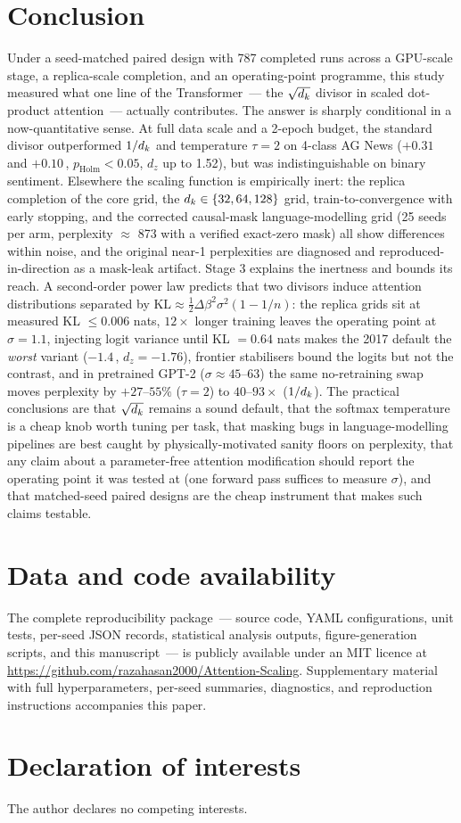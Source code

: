 \section{Conclusion}\label{sec:conclusion}
Under a seed-matched paired design with 787 completed runs across a GPU-scale
stage, a replica-scale completion, and an operating-point programme, this
study measured what one line of the Transformer~--- the $\sqrt{d_k}$ divisor
in scaled dot-product attention~--- actually contributes. The answer is
sharply conditional in a now-quantitative sense. At full data scale and a
2-epoch budget, the standard divisor outperformed $1/d_k$ and temperature
$\tau = 2$ on 4-class AG News ($+0.31$ and $+0.10$\,\pp, $p_{\text{Holm}} <
0.05$, $d_z$ up to 1.52), but was indistinguishable on binary sentiment.
Elsewhere the scaling function is empirically inert: the replica completion of
the core grid, the $d_k \in \{32,64,128\}$ grid, train-to-convergence with
early stopping, and the corrected causal-mask language-modelling grid (25
seeds per arm, perple\-xity $\approx$ 873 with a verified exact-zero mask) all
show differences within noise, and the original near-1 perplexities are
diagnosed and reproduced-in-direction as a mask-leak artifact. Stage 3
explains the inertness and bounds its reach. A second-order power law
predicts that two divisors induce attention distributions separated by
$\mathrm{KL} \approx \tfrac{1}{2}\Delta\beta^2\sigma^2(1-1/n)$: the replica
grids sit at measured KL $\le 0.006$ nats, $12\times$ longer training leaves
the operating point at $\sigma = 1.1$, injecting logit variance until
KL $= 0.64$ nats makes the 2017 default the \emph{worst} variant
($-1.4$\,\pp, $d_z = -1.76$), frontier stabilisers bound the logits but not
the contrast, and in pretrained GPT-2 ($\sigma \approx 45$--63) the same
no-retraining swap moves perplexity by $+27$--$55\%$ ($\tau = 2$) to
$40$--$93\times$ ($1/d_k$). The practical conclusions are that $\sqrt{d_k}$
remains a sound default, that the softmax temperature is a cheap knob worth
tuning per task, that masking bugs in language-modelling pipelines are best
caught by physically-motivated sanity floors on perplexity, that any claim
about a parameter-free attention modification should report the operating
point it was tested at (one forward pass suffices to measure $\sigma$), and
that matched-seed paired designs are the cheap instrument that makes such
claims testable.

\section*{Data and code availability}
The complete reproducibility package~--- source code, YAML configurations, unit
tests, per-seed JSON records, statistical analysis outputs, figure-generation
scripts, and this manuscript~--- is publicly available under an MIT licence at
\url{https://github.com/razahasan2000/Attention-Scaling}. Supplementary material
with full hyperparameters, per-seed summaries, diagnostics, and reproduction
instructions accompanies this paper.

\section*{Declaration of interests}
The author declares no competing interests.
